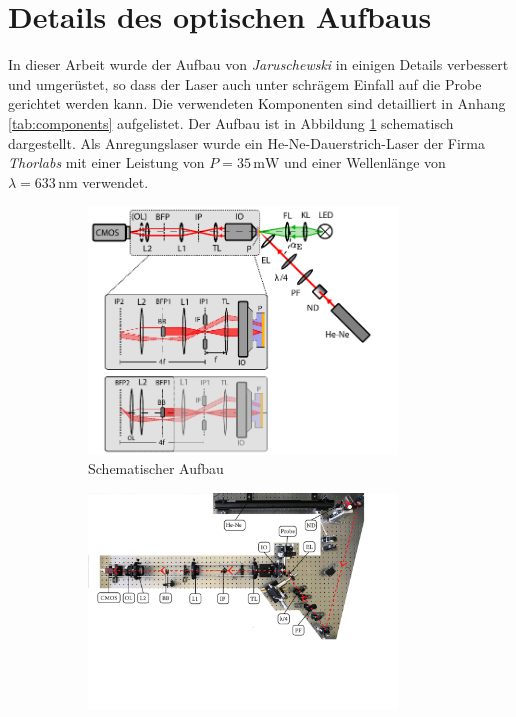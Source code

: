 \documentclass[a4paper, titlepage,  ngerman, fullpage]{book}
\begin{document}
	\section{Details des optischen Aufbaus}
	In dieser Arbeit wurde der Aufbau von \textit{Jaruschewski} \cite{Jaruschewski.2020} in einigen Details verbessert und umgerüstet, so dass der Laser auch unter schrägem Einfall auf die Probe gerichtet werden kann. Die verwendeten Komponenten sind detailliert in Anhang \ref{tab:components} aufgelistet. Der Aufbau ist in Abbildung \ref{fig:aufbau_schema} schematisch dargestellt. Als Anregungslaser wurde ein He-Ne-Dauerstrich-Laser der Firma \textit{Thorlabs} mit einer Leistung von $P = 35 \,\mathrm{mW}$ und einer Wellenlänge von $\lambda = 633\,\mathrm{nm}$ verwendet.
	\begin{figure}
		\centering
		\begin{subfigure}{0.9\textwidth}		
			\centering
			\includegraphics[width=0.9\textwidth]{figures/Aufbau_Schema.pdf}
			\caption{Schematischer Aufbau}			
			\label{fig:aufbau_schema}
		\end{subfigure}
		\vfil
		\begin{subfigure}{0.9\textwidth} 
			\centering
			\includegraphics[width=0.9\textwidth]{figures/aufsicht_aufbau_anotated.jpg}

\end{subfigure}
\end{figure}
\end{document}
